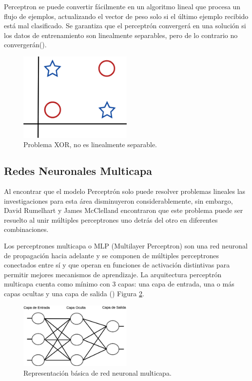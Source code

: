 Perceptron se puede convertir fácilmente en un algoritmo lineal que procesa un flujo de ejemplos, actualizando el vector de peso solo si el último ejemplo recibido está mal clasificado. Se garantiza que el perceptrón convergerá en una solución si los datos de entrenamiento son linealmente separables, pero de lo contrario no convergerán(\cite{flach2012Machine}).

\begin{figure}[H]
    \centering
    \includegraphics[width=0.5\textwidth]{MarcoTeorico/imgs/XOR.png}
    \caption{Problema XOR, no es linealmente separable.}
    \label{fig:xor}
\end{figure}


\subsection{Redes Neuronales Multicapa}


Al encontrar que el modelo Perceptrón solo puede resolver problemas lineales las investigaciones para esta área disminuyeron considerablemente, sin embargo, David Rumelhart y James McClelland encontraron que este problema puede ser resuelto al unir múltiples perceptrones uno detrás del otro en diferentes combinaciones.

Los perceptrones multicapa o MLP (Multilayer Perceptron) son una red neuronal de propagación hacia adelante y se componen de múltiples perceptrones conectados entre sí y que operan en funciones de activación distintivas para permitir mejores mecanismos de aprendizaje. La arquitectura perceptrón multicapa cuenta como mínimo con 3 capas: una capa de entrada, una o más capas ocultas y una capa de salida (\cite{swamynathan2017Mastering}) Figura \ref{fig:mlp}.

\begin{figure}[H]
    \centering
    \includegraphics[width=0.5\textwidth]{MarcoTeorico/imgs/MLP.png}
    \caption{Representación básica de red neuronal multicapa.}
    \label{fig:mlp}
\end{figure}

